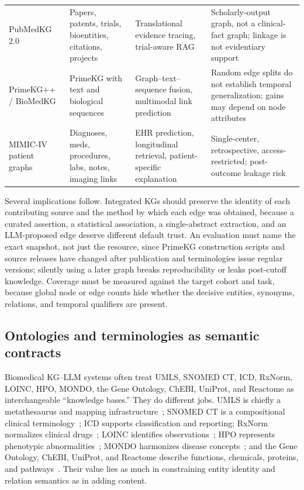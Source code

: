 \begin{table}[!t]
\begin{tabularx}{\textwidth}{@{}L{2.6cm} Y Y Y@{}}
PubMedKG 2.0~\cite{xu2025pubmedkg} & Papers, patents, trials, bioentities, citations, projects & Translational evidence tracing, trial-aware RAG & Scholarly-output graph, not a clinical-fact graph; linkage is not evidentiary support \\
PrimeKG++ / BioMedKG~\cite{dang2025biomedkg} & PrimeKG with text and biological sequences & Graph--text--sequence fusion, multimodal link prediction & Random edge splits do not establish temporal generalization; gains may depend on node attributes \\
MIMIC-IV patient graphs~\cite{johnson2024mimiciv,johnson2023mimicnote} & Diagnoses, meds, procedures, labs, notes, imaging links & EHR prediction, longitudinal retrieval, patient-specific explanation & Single-center, retrospective, access-restricted; post-outcome leakage risk \\
\bottomrule
\end{tabularx}
\end{table}

Several implications follow. Integrated KGs should preserve the identity of each contributing source and the method by which each edge was obtained, because a curated assertion, a statistical association, a single-abstract extraction, and an LLM-proposed edge deserve different default trust. An evaluation must name the exact snapshot, not just the resource, since PrimeKG construction scripts and source releases have changed after publication and terminologies issue regular versions; silently using a later graph breaks reproducibility or leaks post-cutoff knowledge. Coverage must be measured against the target cohort and task, because global node or edge counts hide whether the decisive entities, synonyms, relations, and temporal qualifiers are present.

\subsection{Ontologies and terminologies as semantic contracts}

Biomedical KG--LLM systems often treat UMLS, SNOMED CT, ICD, RxNorm, LOINC, HPO, MONDO, the Gene Ontology, ChEBI, UniProt, and Reactome as interchangeable ``knowledge bases.'' They do different jobs. UMLS is chiefly a metathesaurus and mapping infrastructure~\cite{umls}; SNOMED CT is a compositional clinical terminology~\cite{snomedct}; ICD supports classification and reporting; RxNorm normalizes clinical drugs~\cite{rxnorm}; LOINC identifies observations~\cite{loinc}; HPO represents phenotypic abnormalities~\cite{hpo}; MONDO harmonizes disease concepts~\cite{mondo}; and the Gene Ontology, ChEBI, UniProt, and Reactome describe functions, chemicals, proteins, and pathways~\cite{geneontology,chebi}. Their value lies as much in constraining entity identity and relation semantics as in adding content.

